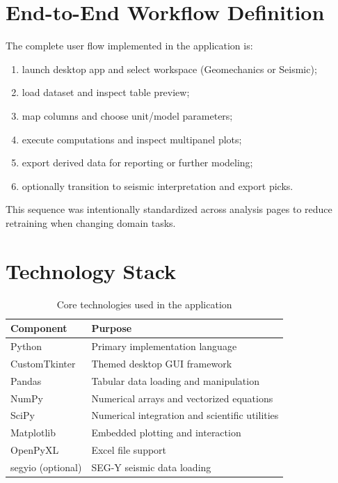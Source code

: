 \documentclass[12pt,a4paper]{report}
\begin{document}
\section{End-to-End Workflow Definition}
The complete user flow implemented in the application is:
\begin{enumerate}
    \item launch desktop app and select workspace (Geomechanics or Seismic);
    \item load dataset and inspect table preview;
    \item map columns and choose unit/model parameters;
    \item execute computations and inspect multipanel plots;
    \item export derived data for reporting or further modeling;
    \item optionally transition to seismic interpretation and export picks.
\end{enumerate}

This sequence was intentionally standardized across analysis pages to reduce retraining when changing domain tasks.

\section{Technology Stack}
\begin{table}[H]
\centering
\caption{Core technologies used in the application}
\begin{tabular}{p{4cm}p{10cm}}
\toprule
Component & Purpose \\
\midrule
Python & Primary implementation language \\
CustomTkinter & Themed desktop GUI framework \\
Pandas & Tabular data loading and manipulation \\
NumPy & Numerical arrays and vectorized equations \\
SciPy & Numerical integration and scientific utilities \\
Matplotlib & Embedded plotting and interaction \\
OpenPyXL & Excel file support \\
segyio (optional) & SEG-Y seismic data loading \\
\bottomrule
\end{tabular}
\end{table}
\end{document}
